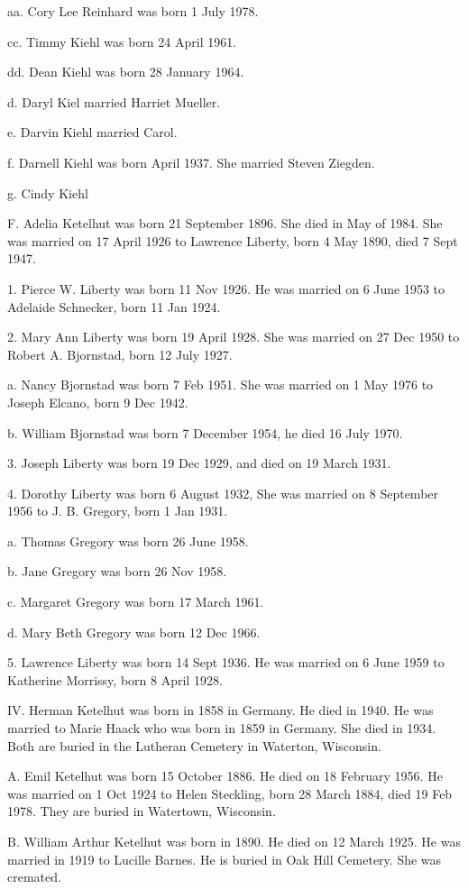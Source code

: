\documentclass[a4paper]{article}
\begin{document}
aa. Cory Lee Reinhard was born 1 July 1978.

cc. Timmy Kiehl was born 24 April 1961.

dd. Dean Kiehl was born 28 January 1964.

d. Daryl Kiel married Harriet Mueller.

e. Darvin Kiehl married Carol.

f. Darnell Kiehl was born April 1937.  She married Steven Ziegden.

g. Cindy Kiehl

F. Adelia Ketelhut was born 21 September 1896.  She died in May of 1984.  She was married on 17 April 1926 to Lawrence Liberty, born 4 May 1890, died 7 Sept 1947.

1. Pierce W. Liberty was born 11 Nov 1926.  He was married on 6 June 1953 to Adelaide Schnecker, born 11 Jan 1924.

2. Mary Ann Liberty was born 19 April 1928.  She was married on 27 Dec 1950 to Robert A. Bjornstad, born 12 July 1927.

a. Nancy Bjornstad was born 7 Feb 1951.  She was married on 1 May 1976 to Joseph Elcano, born 9 Dec 1942.

b. William Bjornstad was born 7 December 1954, he died 16 July 1970.

3. Joseph Liberty was born 19 Dec 1929, and died on 19 March 1931.

4. Dorothy Liberty was born 6 August 1932,  She was married on 8 September 1956 to J. B. Gregory, born 1 Jan 1931.

a. Thomas Gregory was born 26 June 1958.

b. Jane Gregory was born 26 Nov 1958.

c. Margaret Gregory was born 17 March 1961.

d. Mary Beth Gregory was born 12 Dec 1966.

5. Lawrence Liberty was born 14 Sept 1936.  He was married on 6 June 1959 to Katherine Morrissy, born 8 April 1928.

IV. Herman Ketelhut was born in 1858 in Germany.  He died in 1940.  He was married to Marie Haack who was born in 1859 in Germany.  She died in 1934.  Both are buried in the Lutheran Cemetery in Waterton, Wisconsin.

A. Emil  Ketelhut was born 15 October 1886.  He died on 18 February 1956.  He was married on 1 Oct 1924 to Helen Steckling, born 28 March 1884, died 19 Feb 1978. They are buried in Watertown, Wisconsin.

B. William Arthur Ketelhut was born in 1890.  He died on 12 March 1925.  He was married in 1919 to Lucille Barnes.  He is buried in Oak Hill Cemetery.  She was cremated.
\end{document}
